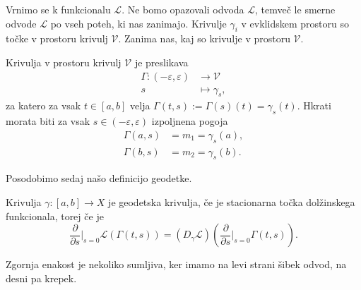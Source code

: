 Vrnimo se k funkcionalu $\mathcal{L}$. Ne bomo opazovali odvoda $\mathcal{L}$, temveč le smerne odvode $\mathcal{L}$ po vseh poteh, ki nas zanimajo. Krivulje $\gamma_i$ v evklidskem prostoru so točke v prostoru krivulj $\mathcal{V}$. Zanima nas,
kaj so krivulje v prostoru $\mathcal{V}$.

\begin{definicija}
\label{def_krivulja_v_prostoru_krivulj}
Krivulja v prostoru krivulj $\mathcal{V}$ je preslikava \begin{align*}
    \Gamma : (-\varepsilon, \varepsilon) &\longrightarrow \mathcal{V} \\
    s &\longmapsto \gamma_s,
\end{align*}
za katero za vsak $t \in  [a,b]$ velja $\Gamma(t,s) := \Gamma(s)(t) = \gamma_s(t)$. Hkrati morata biti za vsak $s \in (-\varepsilon, \varepsilon)$ izpoljnena pogoja \begin{align*}
    \Gamma(a,s) &= m_1 = \gamma_s(a), \\
    \Gamma(b,s) &= m_2 = \gamma_s(b).
\end{align*}
\end{definicija}

Posodobimo sedaj našo definicijo geodetke.

\begin{definicija}
\label{def_posodobljne_geodetkse_krivulje}
Krivulja $\gamma : [a,b] \to  X$ je geodetska krivulja, če je stacionarna točka dolžinskega funkcionala, torej če je \begin{equation*}
\frac{ \partial  }{ \partial s} \bigg|_{s = 0} \mathcal{L}(\Gamma(t,s)) = (D_\gamma \mathcal{L}) \left( \frac{ \partial  }{ \partial s} \bigg|_{s = 0} \Gamma(t,s) \right) . 
\end{equation*}    
\end{definicija}

\begin{opomba}
Zgornja enakost je nekoliko sumljiva, ker imamo na levi strani šibek odvod, na desni pa krepek.
\end{opomba}

